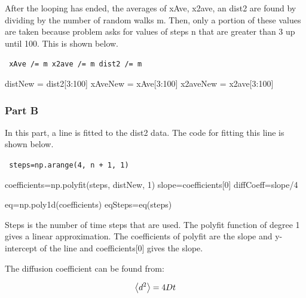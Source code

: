 \documentclass[notitlepage,aps,prd,nofootinbib]{revtex4-1}
\begin{document}
After the looping has ended, the averages of xAve, x2ave, an dist2 are found by dividing by the number of random walks m. Then, only a portion of these values are taken because problem asks for values of steps n that are greater than 3 up until 100. This is shown below. \newline 

{\tt 
\noindent xAve /= m                   \newline
\noindent x2ave /= m                  \newline
\noindent dist2 /= m                  \newline

\noindent distNew = dist2[3:100]      \newline                    
\noindent xAveNew = xAve[3:100]       \newline                     
\noindent x2aveNew = x2ave[3:100]                   
}

\subsubsection{Part B}

In this part, a line is fitted to the dist2 data. The code for fitting this line is shown below. \newline

{\tt 
	\noindent steps=np.arange(4, n + 1, 1)                   \newline    
	
	\noindent coefficients=np.polyfit(steps, distNew, 1)     \newline 
	\noindent slope=coefficients[0]                          \newline          
	\noindent diffCoeff=slope/4                               \newline         
	
	\noindent eq=np.poly1d(coefficients)                     \newline               
	\noindent eqSteps=eq(steps)   }                          \newline


Steps is the number of time steps that are used. The polyfit function of degree 1 gives a linear approximation. The coefficients of polyfit are the slope and y-intercept of the line and coefficients[0] gives the slope. 

The diffusion coefficient can be found from:

\begin{equation}
	\expval{d^{2}}=4Dt
\end{equation}
\end{document}
